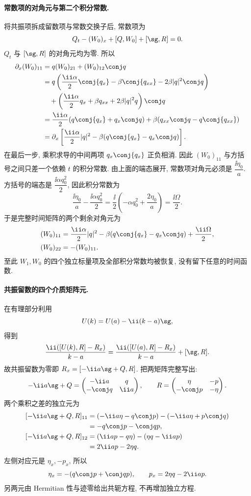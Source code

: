\paragraph{常数项的对角元与第二个积分常数.}
将共振项拆成留数项与常数交换子后,
常数项为
\[
Q_t-(W_0)_x+[Q,W_0]+[\sg,R]=0.
\]
$Q_t$ 与 $[\sg,R]$ 的对角元均为零.
所以
\[
\begin{aligned}
\partial_x(W_0)_{11}
&=q(W_0)_{21}+(W_0)_{12}\conj q\\
&=q\left(\dfrac{\ii\alpha}{2}\conj{q_x}
-\beta\conj{q_{xx}}-2\beta|q|^2\conj q\right)\\
&\quad+\left(\dfrac{\ii\alpha}{2}q_x
+\beta q_{xx}+2\beta|q|^2q\right)\conj q\\
&=\dfrac{\ii\alpha}{2}(q\conj{q_x}+q_x\conj q)
+\beta(q_{xx}\conj q-q\conj{q_{xx}})\\
&=\partial_x\left[
\dfrac{\ii\alpha}{2}|q|^2
-\beta(q\conj{q_x}-q_x\conj q)
\right].
\end{aligned}
\]
在最后一步, 乘积求导的中间两项
$q_x\conj{q_x}$ 正负相消.
因此 $(W_0)_{11}$ 与方括号之间只差一个依赖 $t$ 的积分常数.
由上面的端态展开, 常数项对角元必须是
$\dfrac{\ii\eta_0}{a}$.
方括号的端态是 $\dfrac{\ii\alpha q_0^2}{2}$,
因此积分常数为
\[
\dfrac{\ii\eta_0}{a}-\dfrac{\ii\alpha q_0^2}{2}
=\dfrac{\ii}{2}\left(-\alpha q_0^2+\dfrac{2\eta_0}{a}\right)
=\dfrac{\ii\Omega}{2}.
\]
于是完整时间矩阵的两个剩余对角元为
\[
\begin{aligned}
(W_0)_{11}
&=\dfrac{\ii\alpha}{2}|q|^2
-\beta(q\conj{q_x}-q_x\conj q)+\dfrac{\ii\Omega}{2},\\
(W_0)_{22}&=-(W_0)_{11}.
\end{aligned}
\]
至此 $W_1,W_0$ 的四个独立标量项及全部积分常数均被恢复,
没有留下任意的时间函数.

\paragraph{共振留数的四个介质矩阵元.}
在有理部分利用
\[
 U(k)= U(a)-\ii(k-a)\sg,
\]
得到
\[
\dfrac{\ii([ U(k),R]-R_x)}{k-a}
=\dfrac{\ii([ U(a),R]-R_x)}{k-a}+[\sg,R].
\]
故共振留数为零即
$R_x=[-\ii a\sg+Q,R]$.
把两矩阵完整写出:
\[
-\ii a\sg+Q
=\begin{pmatrix}-\ii a&q\\-\conj q&\ii a\end{pmatrix},\qquad
R=\begin{pmatrix}\eta&-p\\-\conj p&-\eta\end{pmatrix}.
\]
两个乘积之差的独立元为
\[
\begin{aligned}
\relax[-\ii a\sg+Q,R]_{11}
&=(-\ii a\eta-q\conj p)-(-\ii a\eta+p\conj q)\\
&=-q\conj p-\conj q p,\\
[-\ii a\sg+Q,R]_{12}
&=(\ii ap-q\eta)-(\eta q-\ii ap)\\
&=2\ii ap-2\eta q.
\end{aligned}
\]
左侧对应元是 $\eta_x,-p_x$, 所以
\[
\eta_x=-(q\conj p+\conj q p),\qquad
p_x=2\eta q-2\ii ap.
\]
另两元由 Hermitian 性与迹零给出共轭方程, 不再增加独立方程.

